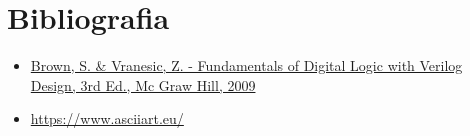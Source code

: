 
\section{Bibliografia} %

\begin{frame}{\insertsection} 
	\begin{itemize}
		\item \href{https://www.google.com.br/search?q=filetype\%3Apdf+Fundamentals+of+Digital+Logic+with+Verilog+Design+&oq=filetype\%3Apdf}{Brown, S. \& Vranesic, Z. - Fundamentals of Digital Logic with Verilog Design, 3rd Ed., Mc Graw Hill, 2009}
		\item \href{https://www.asciiart.eu/}{https://www.asciiart.eu/}
	\end{itemize}
\end{frame}

